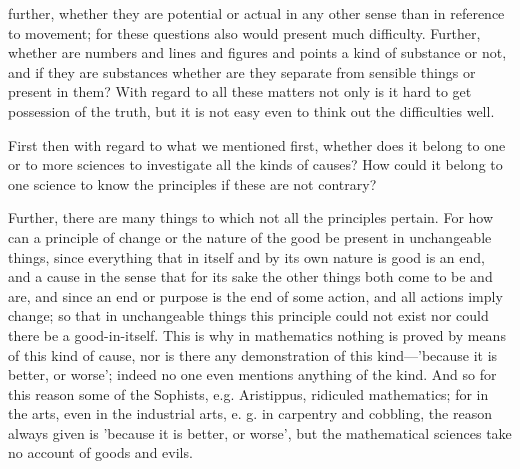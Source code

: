 further, whether they are potential or actual in any other sense than in reference to movement; for these questions also would present much difficulty. Further, whether are numbers and lines and figures and points a kind of substance or not, and if they are substances whether are they separate from sensible things or present in them? With regard to all these matters not only is it hard to get possession of the truth, but it is not easy even to think out the difficulties well.


First then with regard to what we mentioned first, whether does it belong to one or to more sciences to investigate all the kinds of causes? How could it belong to one science to know the principles if these are not contrary?

Further, there are many things to which not all the principles pertain. For how can a principle of change or the nature of the good be present in unchangeable things, since everything that in itself and by its own nature is good is an end, and a cause in the sense that for its sake the other things both come to be and are, and since an end or purpose is the end of some action, and all actions imply change; so that in unchangeable things this principle could not exist nor could there be a good-in-itself. This is why in mathematics nothing is proved by means of this kind of cause, nor is there any demonstration of this kind—'because it is better, or worse'; indeed no one even mentions anything of the kind. And so for this reason some of the Sophists, e.g. Aristippus, ridiculed mathematics; for in the arts, even in the industrial arts, e. g. in carpentry and cobbling, the reason always given is 'because it is better, or worse', but the mathematical sciences take no account of goods and evils.


